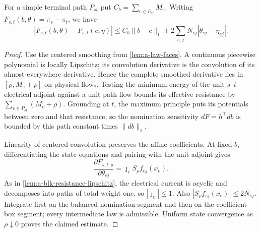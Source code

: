 \begin{lemma}
\label{lem:a-law-sensitivity}
For a simple terminal path $P_{st}$ put $C_b=\sum_{e\in P_{st}}M_e$.
Writing $F_{s,t}(b,\theta)=\pi_s-\pi_t$, we have
\begin{equation}
 |F_{s,t}(b,\theta)-F_{s,t}(c,\eta)|
 \le C_b\|b-c\|_1+
              2\sum_{e,j}N_{ej}|\theta_{ej}-\eta_{ej}|.
 \label{eq:a-law-sensitivity}
\end{equation}
\end{lemma}
\begin{proof}
Use the centered smoothing from \cref{lem:a-law-faces}. A continuous
piecewise polynomial is locally Lipschitz; its convolution derivative
is the convolution of its almost-everywhere derivative. Hence the
complete smoothed derivative lies in $[\rho,M_e+\rho]$ on physical flows.
Testing the minimum energy of the unit $s$--$t$ electrical adjoint
against a unit path flow bounds its effective resistance by
$\sum_{e\in P_{st}}(M_e+\rho)$. Grounding at $t$, the maximum principle
puts its potentials between zero and that resistance, so the nomination
sensitivity $dF=h^\top db$ is bounded by this path constant times
$\|db\|_1$.

Linearity of centered convolution preserves the affine coefficients.
At fixed $b$, differentiating the state equations and pairing with the
unit adjoint gives
\[
 \frac{\partial F_{s,t,\rho}}{\partial\theta_{ej}}
       =\jmath_e S_\rho f_{ej}(x_e).
\]
As in \cref{lem:a-blk-resistance-lipschitz}, the electrical current is
acyclic and decomposes into paths of total weight one, so
$|\jmath_e|\le1$. Also $|S_\rho f_{ej}(x_e)|\le2N_{ej}$. Integrate first
on the balanced nomination segment and then on the coefficient-box
segment; every intermediate law is admissible. Uniform state convergence
as $\rho\downarrow0$ proves the claimed estimate.
\end{proof}


